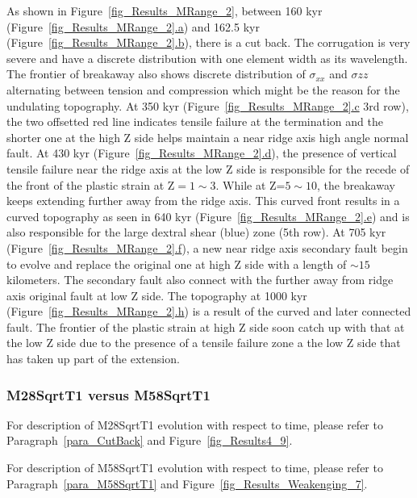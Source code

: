 As shown in Figure~\hyperref[fig_Results_MRange_2]{\ref{fig_Results_MRange_2}}, between 160 kyr (Figure~\hyperref[fig_Results_MRange_2]{\ref{fig_Results_MRange_2}.a}) and 162.5 kyr (Figure~\hyperref[fig_Results_MRange_2]{\ref{fig_Results_MRange_2}.b}), there is a cut back. The corrugation is very severe and have a discrete distribution with one element width as its wavelength. The frontier of breakaway also shows discrete distribution of $\sigma_{xx}$ and $\sigma{zz}$ alternating between tension and compression which might be the reason for the undulating topography. At 350 kyr (Figure~\hyperref[fig_Results_MRange_2]{\ref{fig_Results_MRange_2}.c} 3rd row), the two offsetted red line indicates tensile failure at the termination and the shorter one at the high Z side helps maintain a near ridge axis high angle normal fault. At 430 kyr (Figure~\hyperref[fig_Results_MRange_2]{\ref{fig_Results_MRange_2}.d}), the presence of vertical tensile failure near the ridge axis at the low Z side is responsible for the recede of the front of the plastic strain at Z$=1\sim3$. While at Z=$5\sim10$, the breakaway keeps extending further away from the ridge axis. This curved front results in a curved topography as seen in 640 kyr (Figure~\hyperref[fig_Results_MRange_2]{\ref{fig_Results_MRange_2}.e}) and is also responsible for the large dextral shear (blue) zone (5th row). At 705 kyr (Figure~\hyperref[fig_Results_MRange_2]{\ref{fig_Results_MRange_2}.f}), a new near ridge axis secondary fault begin to evolve and replace the original one at high Z side with a length of $\sim15$ kilometers. The secondary fault also connect with the further away from ridge axis original fault at low Z side. The topography at 1000 kyr (Figure~\hyperref[fig_Results_MRange_2]{\ref{fig_Results_MRange_2}.h}) is a result of the curved and later connected fault. The frontier of the plastic strain at high Z side soon catch up with that at the low Z side due to the presence of a tensile failure zone a the low Z side that has taken up part of the extension.
       
\subsubsection{M28SqrtT1 versus M58SqrtT1}
For description of M28SqrtT1 evolution with respect to time, please refer to Paragraph~\hyperref[para_CutBack]{\ref{para_CutBack}} and Figure~\hyperref[fig_Results4_9]{\ref{fig_Results4_9}}.

For description of M58SqrtT1 evolution with respect to time, please refer to Paragraph~\hyperref[para_M58SqrtT1]{\ref{para_M58SqrtT1}} and Figure~\hyperref[fig_Results_Weakenging_7]{\ref{fig_Results_Weakenging_7}}.


